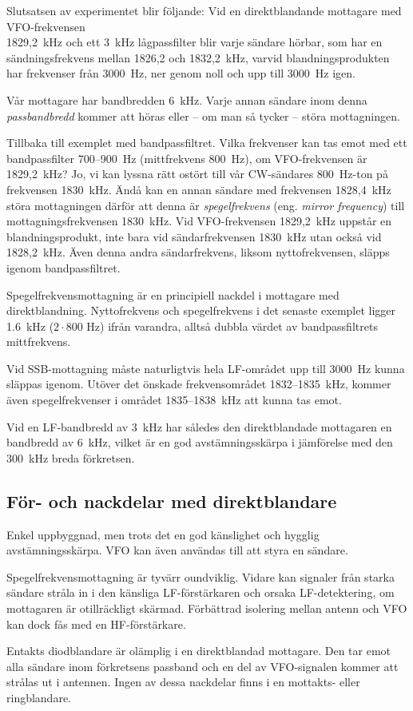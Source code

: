 Slutsatsen av experimentet blir följande:
Vid en direktblandande mottagare med VFO-frekvensen \\ 1829,2~kHz och ett 3~kHz
lågpassfilter blir varje sändare hörbar, som har en sändningsfrekvens mellan
1826,2 och 1832,2~kHz, varvid blandningsprodukten har frekvenser från 3000~Hz, ner
genom noll och upp till 3000~Hz igen.


Vår mottagare har bandbredden \SI{6}{\kilo\hertz}.
Varje annan sändare inom denna \emph{passbandbredd} kommer att höras eller --
om man så tycker -- störa mottagningen.

Tillbaka till exemplet med bandpassfiltret.
Vilka frekvenser kan tas emot med ett bandpassfilter 700--900~Hz
(mittfrekvens 800~Hz), om VFO-frekvensen är 1829,2~kHz?
Jo, vi kan lyssna rätt ostört till vår CW-sändares \SI{800}{\hertz}-ton på
frekvensen \SI{1830}{\kilo\hertz}.
Ändå kan en annan sändare med frekvensen 1828,4~kHz störa mottagningen därför
att denna är \emph{spegelfrekvens} (eng. \emph{mirror frequency}) till
mottagningsfrekvensen 1830~kHz.
Vid VFO-frekvensen 1829,2~kHz uppstår en blandningsprodukt, inte bara vid
sändarfrekvensen 1830~kHz utan också vid 1828,2~kHz.
Även denna andra sändarfrekvens, liksom nyttofrekvensen, släpps igenom
bandpassfiltret.

Spegelfrekvensmottagning är en principiell nackdel i mottagare med
direktblandning.
Nyttofrekvens och spegelfrekvens i det senaste exemplet ligger
\SI{1,6}{\kilo\hertz} (\(2 \cdot 800\) Hz) ifrån varandra, alltså dubbla värdet
av bandpassfiltrets mittfrekvens.

Vid SSB-mottagning måste naturligtvis hela LF-området upp till \SI{3000}{\hertz}
kunna släppas igenom.
Utöver det önskade frekvensområdet 1832--1835~kHz, kommer även spegelfrekvenser
i området 1835--1838~kHz att kunna tas emot.

Vid en LF-bandbredd av \SI{3}{\kilo\hertz} har således den direktblandade
mottagaren en bandbredd av \SI{6}{\kilo\hertz}, vilket är en god
avstämningsskärpa i jämförelse med den \SI{300}{\kilo\hertz} breda förkretsen.

\subsection{För- och nackdelar med direkt\-blandare}

Enkel uppbyggnad, men trots det en god känslighet och hygglig avstämningsskärpa.
VFO kan även användas till att styra en sändare.

Spegelfrekvensmottagning är tyvärr oundviklig.
Vidare kan signaler från starka sändare stråla in i den känsliga LF-förstärkaren
och orsaka LF-detektering, om mottagaren är otillräckligt skärmad.
Förbättrad isolering mellan antenn och VFO kan dock fås med en HF-förstärkare.

Entakts diodblandare är olämplig i en direktblandad mottagare.
Den tar emot alla sändare inom förkretsens passband och en del av VFO-signalen
kommer att strålas ut i antennen.
Ingen av dessa nackdelar finns i en mottakts- eller ringblandare.
